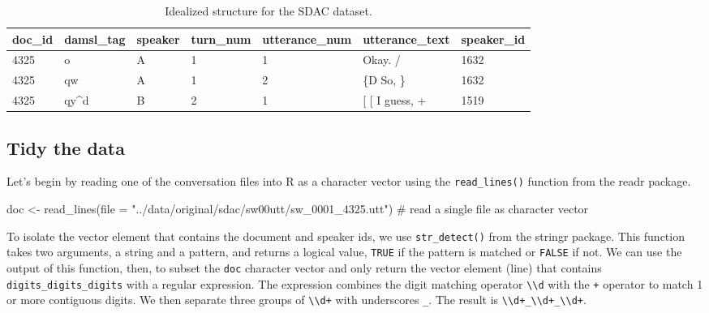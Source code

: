 \documentclass[
  letterpaper,
]{latex/krantz}
\newenvironment{Shaded}{\begin{snugshade}}{\end{snugshade}}
\newcommand{\AttributeTok}[1]{\textcolor[rgb]{0.40,0.45,0.13}{#1}}
\newcommand{\CommentTok}[1]{\textcolor[rgb]{0.37,0.37,0.37}{#1}}
\newcommand{\FunctionTok}[1]{\textcolor[rgb]{0.28,0.35,0.67}{#1}}
\newcommand{\NormalTok}[1]{\textcolor[rgb]{0.00,0.23,0.31}{#1}}
\newcommand{\OtherTok}[1]{\textcolor[rgb]{0.00,0.23,0.31}{#1}}
\newcommand{\StringTok}[1]{\textcolor[rgb]{0.13,0.47,0.30}{#1}}
\begin{document}
\hypertarget{tbl-cd-semi-sdac-idealized-dataset}{}
\begin{table}
\caption{\label{tbl-cd-semi-sdac-idealized-dataset}Idealized structure for the SDAC dataset. }\tabularnewline

\centering
\begin{tabular}{lllllll}
\toprule
doc\_id & damsl\_tag & speaker & turn\_num & utterance\_num & utterance\_text & speaker\_id\\
\midrule
4325 & o & A & 1 & 1 & Okay.  / & 1632\\
4325 & qw & A & 1 & 2 & \{D So, \} & 1632\\
4325 & qy\textasciicircum{}d & B & 2 & 1 & {}[ [ I guess, + & 1519\\
\bottomrule
\end{tabular}
\end{table}

\hypertarget{tidy-the-data-1}{%
\subsection{Tidy the data}\label{tidy-the-data-1}}

Let's begin by reading one of the conversation files into R as a
character vector using the \texttt{read\_lines()} function from the
readr package.

\begin{Shaded}
\begin{Highlighting}[]
\NormalTok{doc }\OtherTok{\textless{}{-}} 
  \FunctionTok{read\_lines}\NormalTok{(}\AttributeTok{file =} \StringTok{"../data/original/sdac/sw00utt/sw\_0001\_4325.utt"}\NormalTok{) }\CommentTok{\# read a single file as character vector}
\end{Highlighting}
\end{Shaded}

To isolate the vector element that contains the document and speaker
ids, we use \texttt{str\_detect()} from the stringr package. This
function takes two arguments, a string and a pattern, and returns a
logical value, \texttt{TRUE} if the pattern is matched or \texttt{FALSE}
if not. We can use the output of this function, then, to subset the
\texttt{doc} character vector and only return the vector element (line)
that contains \texttt{digits\_digits\_digits} with a regular expression.
The expression combines the digit matching operator
\texttt{\textbackslash{}\textbackslash{}d} with the \texttt{+} operator
to match 1 or more contiguous digits. We then separate three groups of
\texttt{\textbackslash{}\textbackslash{}d+} with underscores
\texttt{\_}. The result is
\texttt{\textbackslash{}\textbackslash{}d+\_\textbackslash{}\textbackslash{}d+\_\textbackslash{}\textbackslash{}d+}.
\end{document}
